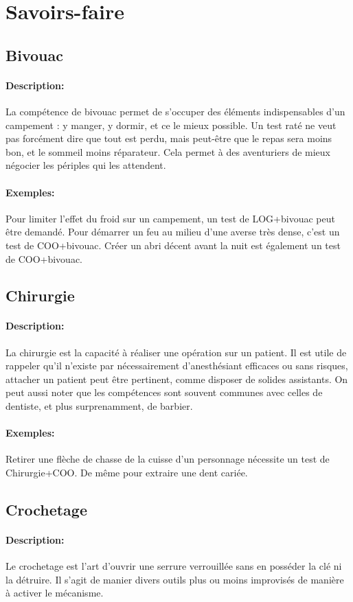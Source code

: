 \documentclass[10pt,a4paper,twocolumn]{book}
\begin{document}
\section{Savoirs-faire}
\subsection{Bivouac}
\paragraph{Description:}
La compétence de bivouac permet de s'occuper des éléments indispensables d'un campement : y manger, y dormir, et ce le mieux possible. Un test raté ne veut pas forcément dire que tout est perdu, mais peut-être que le repas sera moins bon, et le sommeil moins réparateur. Cela permet à des aventuriers de mieux négocier les périples qui les attendent.
\paragraph{Exemples:} Pour limiter l'effet du froid sur un campement, un test de LOG+bivouac peut être demandé. Pour démarrer un feu au milieu d'une averse très dense, c'est un test de COO+bivouac. Créer un abri décent avant la nuit est également un test de COO+bivouac.
\subsection{Chirurgie}
\paragraph{Description:}La chirurgie est la capacité à réaliser une opération sur un patient. Il est utile de rappeler qu'il n'existe par nécessairement d'anesthésiant efficaces ou sans risques, attacher un patient peut être pertinent, comme disposer de solides assistants. On peut aussi noter que les compétences sont souvent communes avec celles de dentiste, et plus surprenamment, de barbier.
\paragraph{Exemples:}Retirer une flèche de chasse de la cuisse d'un personnage nécessite un test de Chirurgie+COO. De même pour extraire une dent cariée.
\subsection{Crochetage}
\paragraph{Description:}Le crochetage est l'art d'ouvrir une serrure verrouillée sans en posséder la clé ni la détruire. Il s'agit de manier divers outils plus ou moins improvisés de manière à activer le mécanisme.
\end{document}
